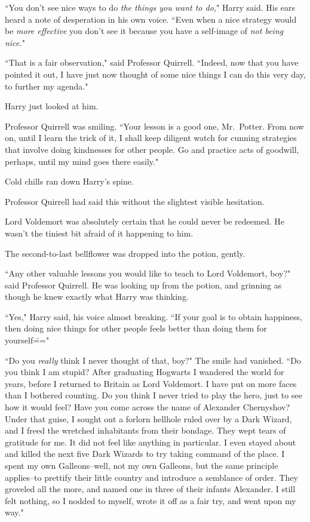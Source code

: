 ``You don't see nice ways to do \emph{the things you want to do,}" Harry said. His ears heard a note of desperation in his own voice. ``Even when a nice strategy would be \emph{more effective} you don't see it because you have a self-image of \emph{not being nice.}"

``That is a fair observation," said Professor Quirrell. ``Indeed, now that you have pointed it out, I have just now thought of some nice things I can do this very day, to further my agenda."

Harry just looked at him.

Professor Quirrell was smiling. ``Your lesson is a good one, Mr.~Potter. From now on, until I learn the trick of it, I shall keep diligent watch for cunning strategies that involve doing kindnesses for other people. Go and practice acts of goodwill, perhaps, until my mind goes there easily."

Cold chills ran down Harry's spine.

Professor Quirrell had said this without the slightest visible hesitation.

Lord Voldemort was absolutely certain that he could never be redeemed. He wasn't the tiniest bit afraid of it happening to him.

The second-to-last bellflower was dropped into the potion, gently.

``Any other valuable lessons you would like to teach to Lord Voldemort, boy?" said Professor Quirrell. He was looking up from the potion, and grinning as though he knew exactly what Harry was thinking.

``Yes," Harry said, his voice almost breaking. ``If your goal is to obtain happiness, then doing nice things for other people feels better than doing them for yourself\==="

``Do you \emph{really} think I never thought of that, boy?" The smile had vanished. ``Do you think I am stupid? After graduating Hogwarts I wandered the world for years, before I returned to Britain as Lord Voldemort. I have put on more faces than I bothered counting. Do you think I never tried to play the hero, just to see how it would feel? Have you come across the name of Alexander Chernyshov? Under that guise, I sought out a forlorn hellhole ruled over by a Dark Wizard, and I freed the wretched inhabitants from their bondage. They wept tears of gratitude for me. It did not feel like anything in particular. I even stayed about and killed the next five Dark Wizards to try taking command of the place. I spent my own Galleons\---well, not my own Galleons, but the same principle applies\---to prettify their little country and introduce a semblance of order. They groveled all the more, and named one in three of their infants Alexander. I still felt nothing, so I nodded to myself, wrote it off as a fair try, and went upon my way."


